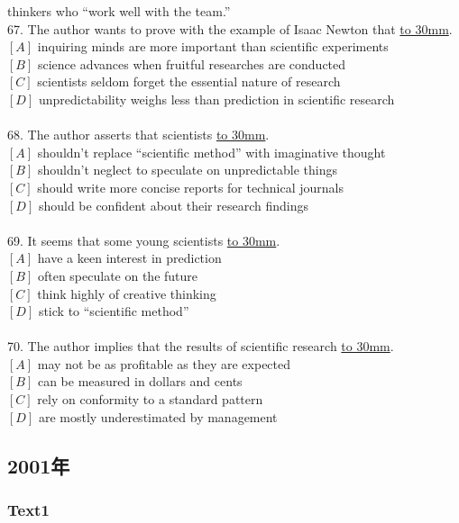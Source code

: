 \documentclass[a4paper]{article}
\begin{document}
\par
thinkers who “work well with the team.”
\\67.	The author wants to prove with the example of Isaac Newton that \underline{\hbox to 30mm{}}.\\$[A]$ inquiring minds are more important than scientific experiments\\$[B]$ science advances when fruitful researches are conducted\\$[C]$ scientists seldom forget the essential nature of research\\$[D]$ unpredictability weighs less than prediction in scientific research\\\\68.	The author asserts that scientists \underline{\hbox to 30mm{}}.\\$[A]$ shouldn’t replace “scientific method” with imaginative thought\\$[B]$ shouldn’t neglect to speculate on unpredictable things\\$[C]$ should write more concise reports for technical journals\\$[D]$ should be confident about their research findings\\\\69.	It seems that some young scientists \underline{\hbox to 30mm{}}.\\$[A]$ have a keen interest in prediction\\$[B]$ often speculate on the future\\$[C]$ think highly of creative thinking\\$[D]$ stick to “scientific method”\\\\70.	The author implies that the results of scientific research \underline{\hbox to 30mm{}}.\\$[A]$ may not be as profitable as they are expected\\$[B]$ can be measured in dollars and cents\\$[C]$ rely on conformity to a standard pattern\\$[D]$ are mostly underestimated by management\\\subsection{2001年}
\subsubsection{Text1}
\end{document}
